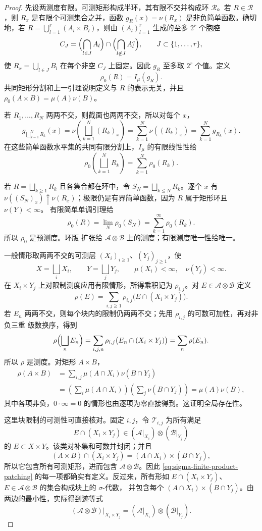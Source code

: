 \begin{proof}
先设两测度有限。可测矩形构成半环，其有限不交并构成环 $\mathcal R$。若
$R\in\mathcal R$，则 $R_x$ 是有限个可测集合之并，函数
$g_R(x)=\nu(R_x)$ 是非负简单函数。确切地，若
$R=\bigcup_{l=1}^r(A_l\times B_l)$，则由 $(A_l)_{l=1}^r$ 生成的至多 $2^r$ 个胞腔
\[
 C_J=\Bigl(\bigcap_{l\in J}A_l\Bigr)
      \cap\Bigl(\bigcap_{l\notin J}A_l^c\Bigr),
 \qquad J\subset\{1,\dots,r\},
\]
使 $R_x=\bigcup_{l\in J}B_l$ 在每个非空 $C_J$ 上固定。因此 $g_R$ 至多取 $2^r$ 个值。定义
\[
 \rho_0(R)=I_\mu(g_R).
 \label{eq:product-premeasure}
\]
共同矩形分割和上一引理说明定义与 $R$ 的表示无关，并且
$\rho_0(A\times B)=\mu(A)\nu(B)$。

若 $R_1,\dots,R_N$ 两两不交，则截面也两两不交，所以对每个 $x$，
\[
 g_{\bigsqcup_{k=1}^NR_k}(x)
 =\nu\!\left(\bigsqcup_{k=1}^N(R_k)_x\right)
 =\sum_{k=1}^N\nu((R_k)_x)
 =\sum_{k=1}^Ng_{R_k}(x).
\]
在这些简单函数水平集的共同有限分割上，$I_\mu$ 的有限线性性给
\[
 \rho_0\!\left(\bigsqcup_{k=1}^NR_k\right)
 =\sum_{k=1}^N\rho_0(R_k).
\]

若 $R=\bigsqcup_{k\ge1}R_k$ 且各集合都在环中，令
$S_N=\bigsqcup_{k\le N}R_k$。逐个 $x$ 有
$\nu((S_N)_x)\uparrow\nu(R_x)$；极限仍是有界简单函数，因为 $R$ 属于矩形环且 $\nu(Y)<\infty$。
有限简单单调引理给
\[
 \rho_0(R)=\lim_N\rho_0(S_N)=\sum_{k=1}^{\infty}\rho_0(R_k).
\]
所以 $\rho_0$ 是预测度。环版 \Caratheodory{} 扩张给
$\mathcal A\otimes\mathcal B$ 上的测度；有限测度唯一性给唯一。

一般情形取两两不交的可测层 $(X_i)_{i\ge1}$、$(Y_j)_{j\ge1}$，使
\[
 X=\bigsqcup_iX_i,\qquad Y=\bigsqcup_jY_j,\qquad
 \mu(X_i)<\infty,\quad \nu(Y_j)<\infty.
\]
在 $X_i\times Y_j$ 上对限制测度应用有限情形，所得乘积记为 $\rho_{i,j}$。对
$E\in\mathcal A\otimes\mathcal B$ 定义
\[
 \rho(E)=\sum_{i,j\ge1}\rho_{i,j}\bigl(E\cap(X_i\times Y_j)\bigr).
 \label{eq:sigma-finite-product-patching}
\]
若 $E_n$ 两两不交，则每个块内的限制仍两两不交；先用 $\rho_{i,j}$ 的可数可加性，再对非负三重
级数换序，得到
\[
 \rho\Bigl(\bigsqcup_nE_n\Bigr)
 =\sum_{i,j,n}\rho_{i,j}\bigl(E_n\cap(X_i\times Y_j)\bigr)
 =\sum_n\rho(E_n).
\]
所以 $\rho$ 是测度。对矩形 $A\times B$，
\[
\begin{aligned}
 \rho(A\times B)
 &=\sum_{i,j}\mu(A\cap X_i)\nu(B\cap Y_j)\\
 &=\left(\sum_i\mu(A\cap X_i)\right)
   \left(\sum_j\nu(B\cap Y_j)\right)
 =\mu(A)\nu(B),
\end{aligned}
\]
其中各项非负，$0\cdot\infty=0$ 的情形也由逐项为零直接得到。这证明全局存在性。

这里块限制的可测性可直接核对。固定 $i,j$，令 $\mathcal T_{i,j}$ 为所有满足
\[
 E\cap(X_i\times Y_j)
 \in(\mathcal A|_{X_i})\otimes(\mathcal B|_{Y_j})
\]
的 $E\subset X\times Y$。该类对补集和可数并封闭；并且
\[
 (A\times B)\cap(X_i\times Y_j)
 =(A\cap X_i)\times(B\cap Y_j),
\]
所以它包含所有可测矩形，进而包含 $\mathcal A\otimes\mathcal B$。因此
\eqref{eq:sigma-finite-product-patching} 的每一项都确实有定义。反过来，所有形如
$E\cap(X_i\times Y_j)$、$E\in\mathcal A\otimes\mathcal B$ 的集合构成块上的 $\sigma$-代数，
并包含每个 $(A\cap X_i)\times(B\cap Y_j)$。由两边的最小性，实际得到迹等式
\[
 (\mathcal A\otimes\mathcal B)|_{X_i\times Y_j}
 =(\mathcal A|_{X_i})\otimes(\mathcal B|_{Y_j}).
\]


\end{proof}
